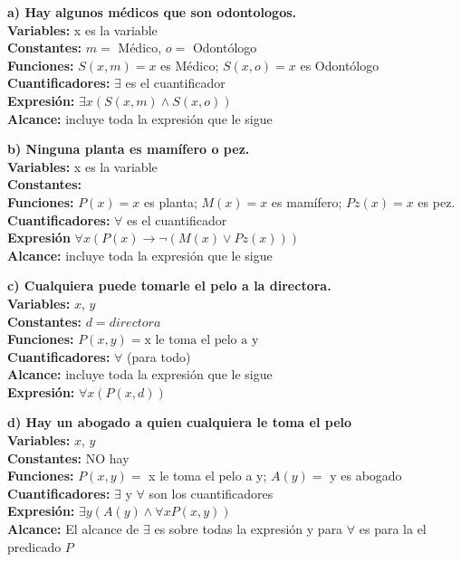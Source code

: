 \begin{multicols}{2}
	\textbf{a) Hay algunos médicos que son odontologos.}\\
	\textbf{Variables:} x es la variable\\
	\textbf{Constantes:} $m =$ Médico, $o =$ Odontólogo\\
	\textbf{Funciones:} $S(x,m)=x$ es Médico; $S(x,o)=x$ es Odontólogo\\
	\textbf{Cuantificadores:} $\exists$ es el cuantificador\\
	\textbf{Expresión: }$\exists x(S(x,m)\land S(x,o))$\\
	\textbf{Alcance:} incluye toda la expresión que le sigue
	\vspace{20px}

	\textbf{b) Ninguna planta es mamífero o pez.}\\
	\textbf{Variables:} x es la variable\\
	\textbf{Constantes: } \\
	\textbf{Funciones:} $P(x)=x$ es planta; $M(x)=x$ es mamífero; $Pz(x)=x$ es pez. \\
	\textbf{Cuantificadores:} $\forall$ es el cuantificador\\
	\textbf{Expresión }$\forall x(P(x)\rightarrow\neg(M(x)\lor Pz(x)))$\\
	\textbf{Alcance:} incluye toda la expresión que le sigue
	\vspace{20px}

	\textbf{c) Cualquiera puede tomarle el pelo a la directora.}\\
	\textbf{Variables: }$x$, $y$\\
	\textbf{Constantes: }$d = directora$ \\
	\textbf{Funciones: }$P(x,y)=\text{x le toma el pelo a y}$\\
	\textbf{Cuantificadores: } $\forall$ (para todo)\\
	\textbf{Alcance:} incluye toda la expresión que le sigue\\
	\textbf{Expresión: }$\forall x(P(x,d))$
	\vspace{20px}

	\textbf{d) Hay un abogado a quien cualquiera le toma el pelo}\\
	\textbf{Variables: }$x$, $y$\\
	\textbf{Constantes: }NO hay\\
	\textbf{Funciones: }$P(x,y)=$ x le toma el pelo a y; $A(y)=$ y es abogado \\
	\textbf{Cuantificadores: }$\exists$ y $\forall$ son los cuantificadores\\
	\textbf{Expresión: } $\exists y (A(y) \land \forall x P(x,y))$\\
	\textbf{Alcance: }El alcance de $\exists$ es sobre todas la expresión y para $\forall$ es para la el predicado $P$
	\vspace{20px}


\end{multicols}
